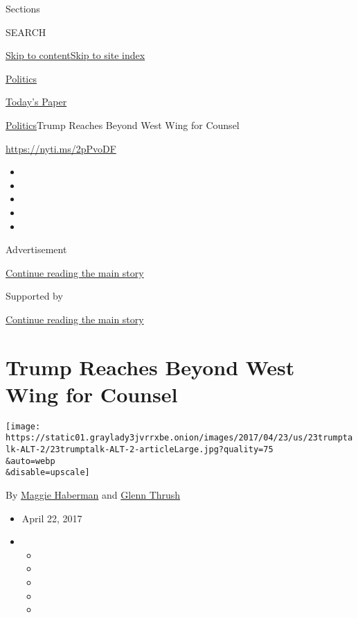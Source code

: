 Sections

SEARCH

\protect\hyperlink{site-content}{Skip to
content}\protect\hyperlink{site-index}{Skip to site index}

\href{https://www.nytimes3xbfgragh.onion/section/politics}{Politics}

\href{https://myaccount.nytimes3xbfgragh.onion/auth/login?response_type=cookie\&client_id=vi}{}

\href{https://www.nytimes3xbfgragh.onion/section/todayspaper}{Today's
Paper}

\href{/section/politics}{Politics}\textbar{}Trump Reaches Beyond West
Wing for Counsel

\url{https://nyti.ms/2pPvoDF}

\begin{itemize}
\item
\item
\item
\item
\item
\end{itemize}

Advertisement

\protect\hyperlink{after-top}{Continue reading the main story}

Supported by

\protect\hyperlink{after-sponsor}{Continue reading the main story}

\hypertarget{trump-reaches-beyond-west-wing-for-counsel}{%
\section{Trump Reaches Beyond West Wing for
Counsel}\label{trump-reaches-beyond-west-wing-for-counsel}}

\texttt{[image: https://static01.graylady3jvrrxbe.onion/images/2017/04/23/us/23trumptalk-ALT-2/23trumptalk-ALT-2-articleLarge.jpg?quality=75\\\&auto=webp\\\&disable=upscale]}

By \href{http://www.nytimes3xbfgragh.onion/by/maggie-haberman}{Maggie
Haberman} and
\href{https://www.nytimes3xbfgragh.onion/by/glenn-thrush}{Glenn Thrush}

\begin{itemize}
\item
  April 22, 2017
\item
  \begin{itemize}
  \item
  \item
  \item
  \item
  \item
  \end{itemize}
\end{itemize}

